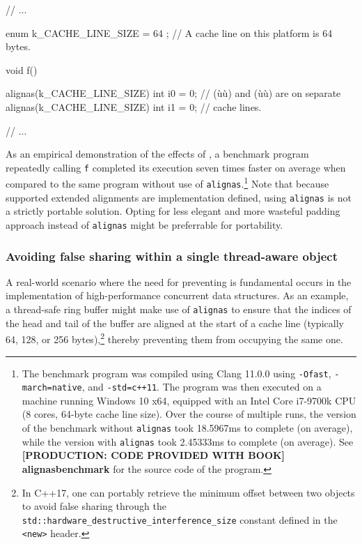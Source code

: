 %
%
\begin{emcppslisting}[emcppsbatch=e2]
// ...

enum { k_CACHE_LINE_SIZE = 64 };  // A cache line on this platform is 64 bytes.

void f()
{
    alignas(k_CACHE_LINE_SIZE) int i0 = 0; // (ù{}ù) and (ù{}ù) are on separate
    alignas(k_CACHE_LINE_SIZE) int i1 = 0; // cache lines.

    // ...
}
\end{emcppslisting}

\noindent As an empirical demonstration of the effects of ,
a benchmark program repeatedly calling \lstinline!f! completed its
execution seven times faster on average when compared to the same
program without use of \lstinline!alignas!.{\cprotect\footnote{The benchmark
program was compiled using Clang 11.0.0 using \lstinline!-Ofast!,
\lstinline!-march=native!, and \mbox{\lstinline!-std=c++11!}. The program was then
executed on a machine running Windows 10 x64, equipped with an Intel
Core i7-9700k CPU (8 cores, 64-byte cache line size). Over the
course of multiple runs, the version of the benchmark without
\lstinline!alignas! took 18.5967ms to complete (on average), while the
version with \lstinline!alignas! took 2.45333ms to complete (on average).
  See \textbf{{[PRODUCTION: CODE PROVIDED WITH BOOK] alignasbenchmark}} for the source code of the program.}} Note that because supported extended alignments are implementation defined, using \lstinline!alignas! is not a strictly portable solution. Opting for less elegant and more wasteful padding approach instead of \lstinline!alignas! might be preferrable for portability.

\subsubsection[Avoiding false sharing within a single thread-aware object]{Avoiding false sharing within a single thread-aware object}\label{avoiding-false-sharing-within-a-single-thread-aware-object}

A real-world scenario where the need for preventing  is fundamental occurs in the implementation of high-performance
concurrent data structures. As an example, a thread-safe ring buffer
might make use of \lstinline!alignas! to ensure that the indices of the
head and tail of the buffer are aligned at the start of a cache line
(typically 64, 128, or 256 bytes),\footnote{In C++17, one can portably retrieve the minimum offset between two objects to avoid false sharing through the \lstinline!std::hardware_destructive_interference_size! constant defined in the \lstinline!<new>! header.}  thereby preventing them from
occupying the same one.

